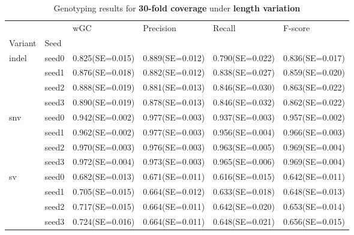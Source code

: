 \documentclass{PHlab-thesis}
\begin{document}
\begin{table}[ht!]
\begin{tabular*}{\textwidth}{@{\extracolsep{\fill}}llllll@{\extracolsep{\fill}}}
\toprule
   &         &               wGC &         Precision &            Recall &           F-score \\
Variant & Seed &                   &                   &                   &                   \\
\midrule
indel & seed0  & 0.825(SE=0.015)&  0.889(SE=0.012)&  0.790(SE=0.022)&  0.836(SE=0.017) \\
   & seed1 &0.876(SE=0.018)&  0.882(SE=0.012)&  0.838(SE=0.027)&  0.859(SE=0.020)\\
   & seed2 & 0.888(SE=0.019)& 0.881(SE=0.013)& 0.846(SE=0.030)& 0.863(SE=0.022)\\
   & seed3 & 0.890(SE=0.019)&  0.878(SE=0.013)&  0.846(SE=0.032)&  0.862(SE=0.022)\\
   
\midrule
snv & seed0 & 0.942(SE=0.002)& 0.977(SE=0.003)& 0.937(SE=0.003)& 0.957(SE=0.002)\\
   & seed1 & 0.962(SE=0.002)&  0.977(SE=0.003)&  0.956(SE=0.004)&  0.966(SE=0.003)\\
   & seed2 & 0.970(SE=0.003)& 0.976(SE=0.003)& 0.963(SE=0.005)& 0.969(SE=0.004)\\
   & seed3 & 0.972(SE=0.004)&  0.973(SE=0.003)&  0.965(SE=0.006)&  0.969(SE=0.004)\\
  
\midrule
sv & seed0  & 0.682(SE=0.013)& 0.671(SE=0.011)& 0.616(SE=0.015) & 0.642(SE=0.011) \\
   & seed1 & 0.705(SE=0.015)&  0.664(SE=0.012)&  0.633(SE=0.018)&  0.648(SE=0.013)\\
   & seed2 & 0.717(SE=0.015)& 0.664(SE=0.011)& 0.642(SE=0.020)& 0.653(SE=0.014)\\
   & seed3 & 0.724(SE=0.016)&  0.664(SE=0.011)&  0.648(SE=0.021)&  0.656(SE=0.015)\\
   
\bottomrule
\end{tabular*}
\caption{Genotyping results for \textbf{30-fold coverage } under \textbf{length variation}\label{table:len-30x}}
\end{table}
\end{document}

